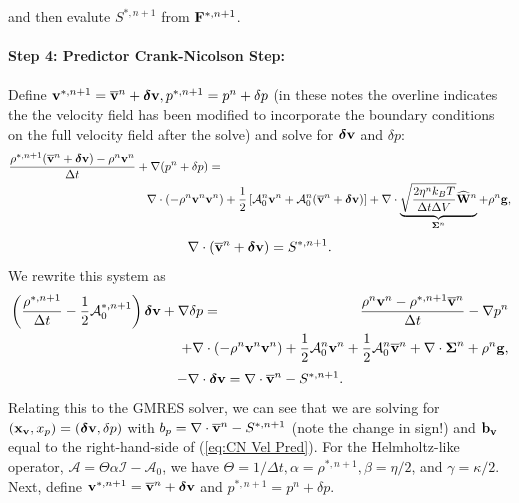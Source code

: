 \documentclass[final]{siamltex}
\def\bb {{\bf b}}
\def\Fb {{\bf F}}
\def\gb {{\bf g}}
\def\vb {{\bf v}}
\def\Wb {{\bf W}}
\def\xb {{\bf x}}
\def\deltab {\boldsymbol{\delta}}
\def\Sigmab {\boldsymbol{\Sigma}}
\def\half   {\frac{1}{2}}
\begin{document}
and then evalute $S^{*,n+1}$ from $\Fb^{*,n+1}$.\\ \\
{\bf Step 4: Predictor Crank-Nicolson Step:}\\ \\
Define $\vb^{*,n+1} = \overline\vb^n + \deltab\vb, p^{*,n+1} = p^n + \delta p$ (in these notes the overline
indicates the the velocity field has been modified to incorporate the boundary conditions on the
full velocity field after the solve) and solve
for $\deltab\vb$ and $\delta p$:
\begin{eqnarray}
\frac{\rho^{*,n+1}(\overline\vb^n + \deltab\vb) - \rho^n\vb^n}{\Delta t} + \nabla(p^n+\delta p) &=&\nonumber\\
&&\hspace{-1in}\nabla\cdot(-\rho^n\vb^n\vb^n) + \half\left[\mathcal{A}_0^n\vb^n + \mathcal{A}_0^n(\overline\vb^n + \deltab\vb)\right] + \nabla\cdot\underbrace{\sqrt{\frac{2\eta^n k_B T}{\Delta t\Delta V}}\widehat\Wb^n}_{\Sigmab^n} + \rho^n\gb,\nonumber\\
\end{eqnarray}
\begin{equation}
\nabla\cdot(\overline\vb^n+\deltab\vb) = S^{*,n+1}.
\end{equation}
We rewrite this system as
\begin{eqnarray}
\left(\frac{\rho^{*,n+1}}{\Delta t} - \half\mathcal{A}_0^{*,n+1}\right)\deltab\vb + \nabla\delta p &=& \frac{\rho^n\vb^n-\rho^{*,n+1}\overline\vb^n}{\Delta t} -\nabla p^n\nonumber\\
&&\hspace{-0.5in}+ \nabla\cdot(-\rho^n\vb^n\vb^n) + \half\mathcal{A}_0^n\vb^n + \half\mathcal{A}_0^n\overline\vb^n + \nabla\cdot\Sigmab^n + \rho^n\gb,\label{eq:CN Vel Pred}
\end{eqnarray}
\begin{equation}
-\nabla\cdot\deltab\vb = \nabla\cdot\overline\vb^n - S^{*,n+1}.
\end{equation}
Relating this to the GMRES solver, we can see that we are solving for 
$(\xb_\vb,x_p) = (\deltab\vb,\delta p)$ with $b_p = \nabla\cdot\overline\vb^n-S^{*,n+1}$ (note the change in sign!) 
and $\bb_\vb$ equal to the right-hand-side of (\ref{eq:CN Vel Pred}).  For the Helmholtz-like operator, 
$\mathcal{A}=\Theta\alpha\mathcal{I} - \mathcal{A}_0$, we have $\Theta=1/\Delta t, \alpha=\rho^{*,n+1}, 
\beta=\eta/2$, and $\gamma=\kappa/2$.
Next, define $\vb^{*,n+1} = \overline\vb^n + \deltab\vb$ and $p^{*,n+1} = p^n + \delta p$.\\ \\
\end{document}
